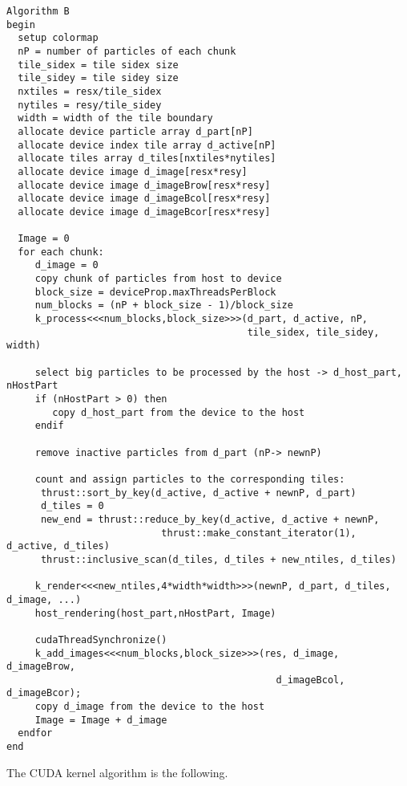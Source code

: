 \documentclass[11pt]{article}
\begin{document}
\small
\begin{verbatim}
Algorithm B
begin
  setup colormap
  nP = number of particles of each chunk
  tile_sidex = tile sidex size 
  tile_sidey = tile sidey size
  nxtiles = resx/tile_sidex
  nytiles = resy/tile_sidey
  width = width of the tile boundary
  allocate device particle array d_part[nP]
  allocate device index tile array d_active[nP]
  allocate tiles array d_tiles[nxtiles*nytiles]   
  allocate device image d_image[resx*resy]
  allocate device image d_imageBrow[resx*resy]
  allocate device image d_imageBcol[resx*resy]
  allocate device image d_imageBcor[resx*resy]
  
  Image = 0
  for each chunk: 
     d_image = 0
     copy chunk of particles from host to device  
     block_size = deviceProp.maxThreadsPerBlock
     num_blocks = (nP + block_size - 1)/block_size
     k_process<<<num_blocks,block_size>>>(d_part, d_active, nP, 
                                          tile_sidex, tile_sidey, width)

     select big particles to be processed by the host -> d_host_part, nHostPart
     if (nHostPart > 0) then
        copy d_host_part from the device to the host 
     endif
 
     remove inactive particles from d_part (nP-> newnP) 

     count and assign particles to the corresponding tiles:
      thrust::sort_by_key(d_active, d_active + newnP, d_part)
      d_tiles = 0
      new_end = thrust::reduce_by_key(d_active, d_active + newnP, 
                           thrust::make_constant_iterator(1), d_active, d_tiles)
      thrust::inclusive_scan(d_tiles, d_tiles + new_ntiles, d_tiles)

     k_render<<<new_ntiles,4*width*width>>>(newnP, d_part, d_tiles, d_image, ...)
     host_rendering(host_part,nHostPart, Image) 

     cudaThreadSynchronize()
     k_add_images<<<num_blocks,block_size>>>(res, d_image, d_imageBrow, 
                                               d_imageBcol, d_imageBcor);
     copy d_image from the device to the host
     Image = Image + d_image
  endfor
end
\end{verbatim}
\normalsize
The CUDA kernel algorithm is the following. 
\small
\end{document}
